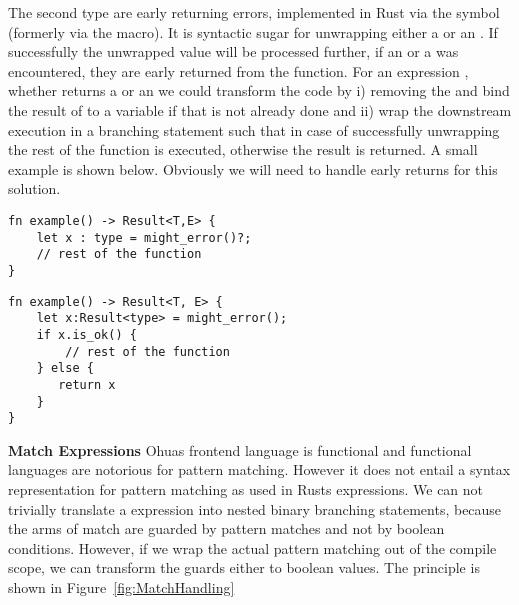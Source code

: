 The second type are early returning errors, implemented in Rust via the   symbol (formerly via the  macro). It is syntactic sugar for unwrapping either a  or an . If successfully the unwrapped value will be processed further, if an  or a  was encountered, they are early returned from the function. For an expression , whether  returns a  or an  we could transform the code by i) removing the  and bind the result of  to a variable if that is not already done and ii) wrap the downstream execution in a branching statement such that in case of successfully unwrapping the rest of the function is executed, otherwise the result is returned. A small example is shown below. Obviously we will need to handle early returns for this solution.

\begin{verbatim}
fn example() -> Result<T,E> {
    let x : type = might_error()?;
    // rest of the function
}
\end{verbatim}

\begin{verbatim}
fn example() -> Result<T, E> {
    let x:Result<type> = might_error();
    if x.is_ok() {
        // rest of the function
    } else {
       return x 
    }   
}
\end{verbatim}


\textbf{Match Expressions}
 Ohuas  frontend language is functional and functional languages are notorious for pattern matching. However it does not entail a syntax representation for pattern matching as used in Rusts  expressions. We can not trivially translate a  expression into nested binary branching statements, because the arms of match are guarded by pattern matches and not by boolean conditions. However, if we wrap the actual pattern matching out of the compile scope, we can transform the guards either to boolean values. The principle is shown in Figure~\ref{fig:MatchHandling}\\

